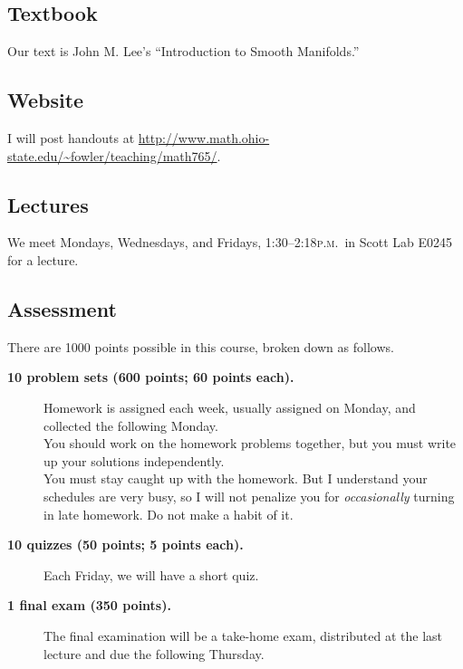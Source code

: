 \documentclass[12pt]{handout}
\newcommand{\peem}{\textsc{p.m.}}
\begin{document}
\subsection*{Textbook}

Our text is John M. Lee's ``Introduction to Smooth Manifolds.''

\subsection*{Website}

I will post handouts at
\url{http://www.math.ohio-state.edu/~fowler/teaching/math765/}.

\subsection*{Lectures}

We meet Mondays, Wednesdays, and Fridays,
1:30--2:18\peem\ in Scott Lab E0245 for a lecture.

\subsection*{Assessment}

There are 1000 points possible in this course, broken down as follows.
\begin{description}
\item[\textsf{\textbf{10 problem sets (600 points; 60 points each).}}]
  Homework is assigned each week, usually assigned on Monday, and
  collected the following Monday.\vspace{1ex}\\
  You should work on the homework problems together, but you must
  write up your solutions independently. \vspace{1ex}\\
  You must stay caught up with the homework. But I understand your
  schedules are very busy, so I will not penalize you for
  \textit{occasionally} turning in late homework.  Do not make a habit
  of it.

\item[\textsf{\textbf{10 quizzes (50 points; 5 points each).}}]  Each
  Friday, we will have a short quiz.

\item[\textsf{\textbf{1 final exam (350 points).}}]  The final
  examination will be a take-home exam, distributed at the last
  lecture and due the following Thursday.
\end{description}

\vspace{1ex}
\end{document}

